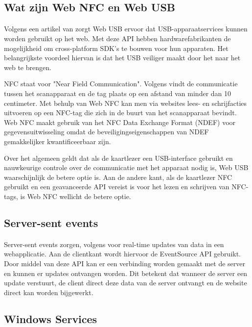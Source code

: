 \bigskip
\subsection{Wat zijn Web NFC en Web USB}
\paragraph{}
Volgens een artikel van \textcite{FrançoisBeaufortUSB} zorgt Web USB ervoor dat USB-apparaatservices kunnen worden gebruikt op het web. Met deze API hebben hardwarefabrikanten de mogelijkheid om cross-platform SDK's te bouwen voor hun apparaten. Het belangrijkste voordeel hiervan is dat het USB veiliger maakt door het naar het web te brengen.

NFC staat voor "Near Field Communication". Volgens \textcite{FrançoisBeaufortNFC} vindt de communicatie tussen het scanapparaat en de tag plaats op een afstand van minder dan 10 centimeter. Met behulp van Web NFC kan men via websites lees- en schrijfacties uitvoeren op een NFC-tag die zich in de buurt van het scanapparaat bevindt. Web NFC maakt gebruik van het NFC Data Exchange Format (NDEF) voor gegevensuitwisseling omdat de beveiligingseigenschappen van NDEF gemakkelijker kwantificeerbaar zijn.

Over het algemeen geldt dat als de kaartlezer een USB-interface gebruikt en nauwkeurige controle over de communicatie met het apparaat nodig is, Web USB waarschijnlijk de betere optie is. Aan de andere kant, als de kaartlezer NFC gebruikt en een geavanceerde API vereist is voor het lezen en schrijven van NFC-tags, is Web NFC wellicht de betere optie.

\bigskip
\subsection{Server-sent events}
\paragraph{}
Server-sent events zorgen, volgens \textcite{DigitalOceanSSE} voor real-time updates van data in een webapplicatie. Aan de clientkant wordt hiervoor de EventSource API gebruikt. Door middel van deze API kan er een verbinding worden gemaakt met de server en kunnen er updates ontvangen worden. Dit betekent dat wanneer de server een update verstuurt, de client direct deze data van de server ontvangt en de website direct kan worden bijgewerkt.

\bigskip
\subsection{Windows Services}
